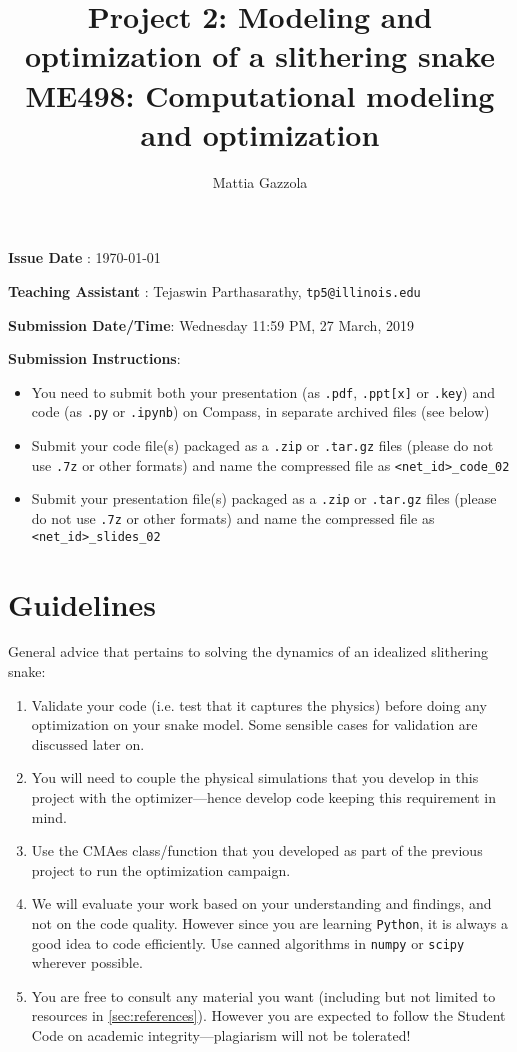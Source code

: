 \documentclass[11pt]{article}
\author{Mattia Gazzola}
\date{}
\title{Project 2: Modeling and optimization of a slithering snake\\\medskip
\large ME498: Computational modeling and optimization}
\begin{document}
\maketitle
\textbf{Issue Date} : \today

\textbf{Teaching Assistant} : Tejaswin Parthasarathy, \texttt{tp5@illinois.edu}

\textbf{Submission Date/Time}: Wednesday 11:59 PM, 27 March, 2019

\textbf{Submission Instructions}:
\begin{itemize}
\item You need to submit both your presentation (as \texttt{.pdf}, \texttt{.ppt[x]} or \texttt{.key}) and code
(as \texttt{.py} or \texttt{.ipynb}) on Compass, in separate archived files (see below)
\item Submit your code file(s) packaged as a \texttt{.zip} or \texttt{.tar.gz} files (please do not use
\texttt{.7z} or other formats) and name the compressed file as \texttt{<net\_id>\_code\_02}
\item Submit your presentation file(s) packaged as a \texttt{.zip} or \texttt{.tar.gz} files (please do not use
\texttt{.7z} or other formats) and name the compressed file as \texttt{<net\_id>\_slides\_02}
\end{itemize}

\newpage

\section{Guidelines}
\label{sec:orgeea9f5b}
General advice that pertains to solving the dynamics of an idealized
slithering snake:
\begin{enumerate}
\item Validate your code (i.e. test that it captures the physics) before doing
any optimization on your snake model. Some sensible cases for validation are
discussed later on.
\item You will need to couple the physical simulations that you develop in this
project with the optimizer---hence develop code keeping this requirement in mind.
\item Use the CMAes class/function that you developed as part of the previous
project to run the optimization campaign.
\item We will evaluate your work based on your understanding and findings, and
not on the code quality. However since you are learning \texttt{Python}, it is
always a good idea to code efficiently. Use canned algorithms in \texttt{numpy} or
\texttt{scipy} wherever possible.
\item You are free to consult any material you want (including but not limited to
resources in \cref{sec:references}). However you are expected to follow the
Student Code on academic integrity---plagiarism will not be tolerated!
\end{enumerate}
\end{document}
